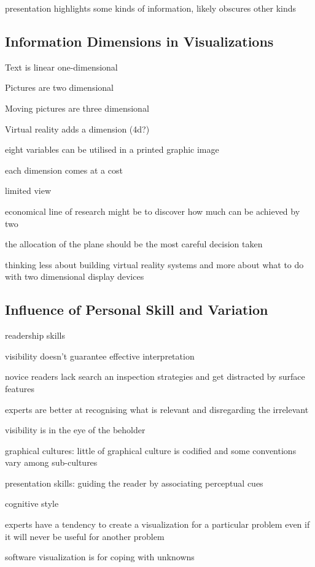 \documentclass[11pt, a4paper, ngerman, twoside]{article}
\theoremstyle{plain}\newtheorem{Lemma}{Lemma}
\theoremstyle{plain}\newtheorem{Satz}[Lemma]{Satz}
\theoremstyle{definition}\newtheorem{Definition}[Lemma]{Definition}
\theoremstyle{definition}\newtheorem*{Beispiel}{Beispiel}
\theoremstyle{remark}\newtheorem*{Bemerkung}{Bemerkung}
\begin{document}
presentation highlights some kinds of information, likely obscures other kinds

\subsection{Information Dimensions in Visualizations}

Text is linear one-dimensional

Pictures are two dimensional

Moving pictures are three dimensional

Virtual reality adds a dimension (4d?)

eight variables can be utilised in a printed graphic image

each dimension comes at a cost

limited view 

economical line of research might be to discover how much can be achieved by two

the allocation of the plane should be the most careful decision taken

thinking less about building virtual reality systems and more about what to do with two dimensional display devices

\subsection{Influence of Personal Skill and Variation}

readership skills

visibility doesn’t guarantee effective interpretation

novice readers lack search an inspection strategies and get distracted by surface features

experts are better at recognising what is relevant and disregarding the irrelevant

visibility is in the eye of the beholder

graphical cultures: little of graphical culture is codified and some conventions vary among sub-cultures

presentation skills: guiding the reader by associating perceptual cues

cognitive style

experts have a tendency to create a visualization for a particular problem even if it will never be useful for another problem

software visualization is for coping with unknowns
\end{document}
